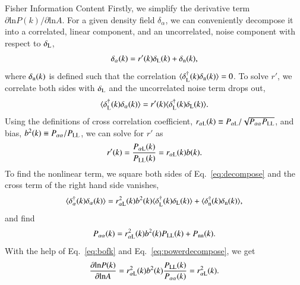 \begin{section}{Fisher Information Content}
  Firstly, we simplify the derivative term
  $\partial \mathrm{ln} P(k)/\partial\mathrm{ln} A$.  For a given density field $\delta_\alpha$, we can
  conveniently decompose it into a correlated, linear component,
  and an uncorrelated, noise component with respect to $\delta_\mathrm{\textcolor{black}{L}}$, 
  \begin{align}
    \delta_{\alpha}(k) = r'(k) \delta_\mathrm{\textcolor{black}{L}} (k) + \delta_\mathrm{\textcolor{black}{n}}(k),
    \label{eq:decompose}
  \end{align}
  where $\delta_\mathrm{\textcolor{black}{n}}(k)$ is defined such that the correlation
  $\langle \delta_\mathrm{\textcolor{black}{L}}^\dagger(k)\delta_\mathrm{\textcolor{black}{n}}(k) \rangle=0$.  To solve $r'$, we correlate
  both sides with $\delta_\mathrm{\textcolor{black}{L}}$ and the uncorrelated noise term drops out,
  \begin{align}
    \langle \delta_\mathrm{\textcolor{black}{L}}^\dagger(k)\delta_\alpha(k) \rangle = r'(k) \langle \delta_\mathrm{\textcolor{black}{L}}^\dagger(k)\delta_\mathrm{\textcolor{black}{L}}(k) \rangle.
    \label{eq:correlating}
  \end{align} 
  Using the definitions of cross correlation coefficient, $r_{\alpha \mathrm{\textcolor{black}{L}}}(k)\equiv P_{\alpha \mathrm{\textcolor{black}{L}}}/\sqrt{P_{\alpha\alpha}P_{\mathrm{\textcolor{black}{LL}}}}$,
  and bias, $b^2(k)\equiv P_{\alpha\alpha}/P_{\mathrm{\textcolor{black}{LL}}}$, we can solve for $r'$ as
  \begin{align}
    r'(k) = \frac{P_{\alpha \mathrm{\textcolor{black}{L}}}(k)}{P_{\mathrm{\textcolor{black}{LL}}}(k)}=r_{\alpha \mathrm{\textcolor{black}{L}}}(k) b(k).
    \label{eq:bofk}                                              
  \end{align}                                                    
  To find the nonlinear term, we square both sides of Eq.~\ref{eq:decompose}
  and the cross term of the right hand side vanishes,             
  \begin{align}                                                  
    \langle \delta_\alpha^\dagger(k) \delta_\alpha(k) \rangle =  
    r_{\alpha \mathrm{\textcolor{black}{L}}}^2(k)b^2(k) \langle \delta_\mathrm{\textcolor{black}{L}}^\dagger(k) \delta_\mathrm{\textcolor{black}{L}}(k) \rangle + 
    \langle \delta_\mathrm{\textcolor{black}{n}}^\dagger(k)\delta_\mathrm{\textcolor{black}{n}}(k) \rangle,          
  \end{align}                                                    
  and find                                                       
  \begin{align}                                                  
    P_{\alpha\alpha}(k) = r_{\alpha \mathrm{\textcolor{black}{L}}}^2(k)b^2(k)P_{\mathrm{\textcolor{black}{LL}}}(k) + P_{\mathrm{\textcolor{black}{nn}}}(k).
    \label{eq:powerdecompose}                                    
  \end{align}                                                    
  With the help of Eq.~\ref{eq:bofk} and Eq.~\ref{eq:powerdecompose},
  we get                                                         
  \begin{align}                                                  
    \frac{\partial \mathrm{ln} P(k) }{ \partial \mathrm{ln} A}=
    r^2_{\alpha \mathrm{\textcolor{black}{L}}}(k)b^2(k)\frac{P_{\mathrm{\textcolor{black}{LL}}}(k)}{P_{\alpha\alpha}(k)}=r^2_{\alpha \mathrm{\textcolor{black}{L}}}(k).
  \end{align}


\end{section}
